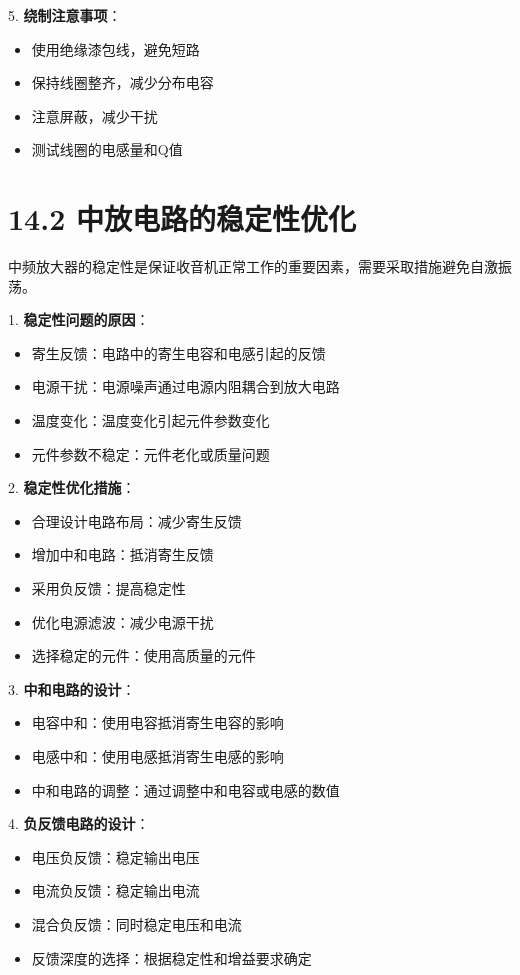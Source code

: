 \documentclass[12pt,UTF8]{ctexbook}
\begin{document}
5. \textbf{绕制注意事项}：
   \begin{itemize}[leftmargin=3.5em]
   \item 使用绝缘漆包线，避免短路
   \item 保持线圈整齐，减少分布电容
   \item 注意屏蔽，减少干扰
   \item 测试线圈的电感量和Q值
   \end{itemize}

\section*{14.2 中放电路的稳定性优化}

中频放大器的稳定性是保证收音机正常工作的重要因素，需要采取措施避免自激振荡。

1. \textbf{稳定性问题的原因}：
   \begin{itemize}[leftmargin=3.5em]
   \item 寄生反馈：电路中的寄生电容和电感引起的反馈
   \item 电源干扰：电源噪声通过电源内阻耦合到放大电路
   \item 温度变化：温度变化引起元件参数变化
   \item 元件参数不稳定：元件老化或质量问题
   \end{itemize}

2. \textbf{稳定性优化措施}：
   \begin{itemize}[leftmargin=3.5em]
   \item 合理设计电路布局：减少寄生反馈
   \item 增加中和电路：抵消寄生反馈
   \item 采用负反馈：提高稳定性
   \item 优化电源滤波：减少电源干扰
   \item 选择稳定的元件：使用高质量的元件
   \end{itemize}

3. \textbf{中和电路的设计}：
   \begin{itemize}[leftmargin=3.5em]
   \item 电容中和：使用电容抵消寄生电容的影响
   \item 电感中和：使用电感抵消寄生电感的影响
   \item 中和电路的调整：通过调整中和电容或电感的数值
   \end{itemize}

4. \textbf{负反馈电路的设计}：
   \begin{itemize}[leftmargin=3.5em]
   \item 电压负反馈：稳定输出电压
   \item 电流负反馈：稳定输出电流
   \item 混合负反馈：同时稳定电压和电流
   \item 反馈深度的选择：根据稳定性和增益要求确定
   \end{itemize}
\end{document}
